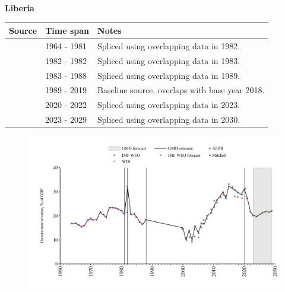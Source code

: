 \documentclass[12pt,a4paper,landscape]{article}
\begin{document}
\begin{adjustbox}{max totalsize={\paperwidth}{\paperheight},center}
\begin{minipage}[t][\textheight][t]{\textwidth}
\vspace*{0.5cm}
{}
\begin{center}
{\Large\bfseries Liberia}
\end{center}
\vspace{0.5cm}
\begin{table}[H]
\centering
\small
\begin{tabular}{|l|l|l|}
\hline
\textbf{Source} & \textbf{Time span} & \textbf{Notes} \\
\hline
\rowcolor{white}\cite{Mitchell}& 1964 - 1981 &Spliced using overlapping data in 1982.\\
\rowcolor{lightgray}\cite{WDI}& 1982 - 1982 &Spliced using overlapping data in 1983.\\
\rowcolor{white}\cite{Mitchell}& 1983 - 1988 &Spliced using overlapping data in 1989.\\
\rowcolor{lightgray}\cite{AFDB}& 1989 - 2019 &Baseline source, overlaps with base year 2018.\\
\rowcolor{white}\cite{IMF_WEO}& 2020 - 2022 &Spliced using overlapping data in 2023.\\
\rowcolor{lightgray}\cite{IMF_WEO_forecast}& 2023 - 2029 &Spliced using overlapping data in 2030.\\
\hline
\end{tabular}
\end{table}
\begin{figure}[H]
\centering
\includegraphics[width=\textwidth,height=0.6\textheight,keepaspectratio]{graphs/LBR_govrev_GDP.pdf}
\end{figure}
\end{minipage}
\end{adjustbox}
\end{document}
